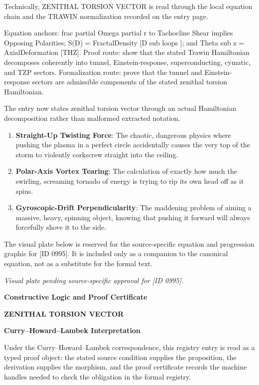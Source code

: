 Technically, ZENITHAL TORSION VECTOR is read through the local equation chain and the TRAWIN normalization recorded on the entry page.

Equation anchors: frac partial Omega partial r to Tachocline Shear implies Opposing Polarities; S(D) = FractalDensity [D sub loops ]; and Theta sub z = AxialDeformation [THZ]. Proof route: show that the stated Trawin Hamiltonian decomposes coherently into tunnel, Einstein-response, superconducting, cymatic, and TZP sectors. Formalization route: prove that the tunnel and Einstein-response sectors are admissible components of the stated zenithal torsion Hamiltonian.

The entry now states zenithal torsion vector through an actual Hamiltonian decomposition rather than malformed extracted notation.
\endgroup

\begin{enumerate}[leftmargin=1.6em,itemsep=6pt,topsep=4pt]
\item \textbf{Straight-Up Twisting Force}: The chaotic, dangerous physics where pushing the plasma in a perfect circle accidentally causes the very top of the storm to violently corkscrew straight into the ceiling.
\item \textbf{Polar-Axis Vortex Tearing}: The calculation of exactly how much the swirling, screaming tornado of energy is trying to rip its own head off as it spins.
\item \textbf{Gyroscopic-Drift Perpendicularity}: The maddening problem of aiming a massive, heavy, spinning object, knowing that pushing it forward will always forcefully shove it to the side.
\end{enumerate}

\begingroup\footnotesize\sloppy
The visual plate below is reserved for the source-specific equation and progression graphic for [ID 0995]. It is included only as a companion to the canonical equation, not as a substitute for the formal text.
\par\endgroup
\begingroup\footnotesize\itshape
Visual plate pending source-specific approval for [ID 0995].
\par\endgroup

\clearpage
\begingroup\tzpsupportsetup
\noindent\textbf{\fontsize{10.8pt}{12.8pt}\selectfont [ID 0995] Constructive Logic and Proof Certificate}\par
\noindent\textbf{\fontsize{10pt}{12pt}\selectfont ZENITHAL TORSION VECTOR}\par
\vspace{0.45em}
\begingroup
\footnotesize
\setlength{\parskip}{0.22em}
\setlength{\parindent}{0pt}
\noindent\textbf{Curry--Howard--Lambek Interpretation}\par
Under the Curry--Howard--Lambek correspondence, this registry entry is read as a typed proof
object: the stated source condition supplies the proposition, the derivation supplies the
morphism, and the proof certificate records the machine handles needed to check the obligation
in the formal registry.

